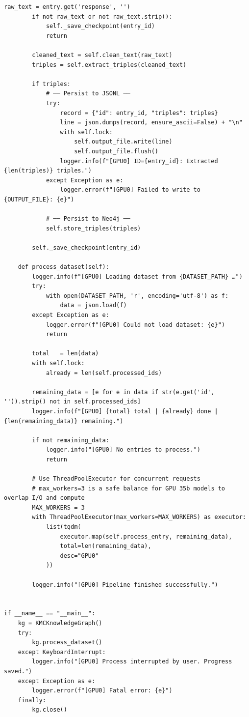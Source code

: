\documentclass[11pt]{article}
\begin{document}
\begin{lstlisting}[style=pythoncode, caption={kg\_generator\_gpu\_0.py}]
        raw_text = entry.get('response', '')
        if not raw_text or not raw_text.strip():
            self._save_checkpoint(entry_id)
            return

        cleaned_text = self.clean_text(raw_text)
        triples = self.extract_triples(cleaned_text)

        if triples:
            # ── Persist to JSONL ──
            try:
                record = {"id": entry_id, "triples": triples}
                line = json.dumps(record, ensure_ascii=False) + "\n"
                with self.lock:
                    self.output_file.write(line)
                    self.output_file.flush()
                logger.info(f"[GPU0] ID={entry_id}: Extracted {len(triples)} triples.")
            except Exception as e:
                logger.error(f"[GPU0] Failed to write to {OUTPUT_FILE}: {e}")

            # ── Persist to Neo4j ──
            self.store_triples(triples)

        self._save_checkpoint(entry_id)

    def process_dataset(self):
        logger.info(f"[GPU0] Loading dataset from {DATASET_PATH} …")
        try:
            with open(DATASET_PATH, 'r', encoding='utf-8') as f:
                data = json.load(f)
        except Exception as e:
            logger.error(f"[GPU0] Could not load dataset: {e}")
            return

        total   = len(data)
        with self.lock:
            already = len(self.processed_ids)
        
        remaining_data = [e for e in data if str(e.get('id', '')).strip() not in self.processed_ids]
        logger.info(f"[GPU0] {total} total | {already} done | {len(remaining_data)} remaining.")

        if not remaining_data:
            logger.info("[GPU0] No entries to process.")
            return

        # Use ThreadPoolExecutor for concurrent requests
        # max_workers=3 is a safe balance for GPU 35b models to overlap I/O and compute
        MAX_WORKERS = 3
        with ThreadPoolExecutor(max_workers=MAX_WORKERS) as executor:
            list(tqdm(
                executor.map(self.process_entry, remaining_data), 
                total=len(remaining_data), 
                desc="GPU0"
            ))

        logger.info("[GPU0] Pipeline finished successfully.")


if __name__ == "__main__":
    kg = KMCKnowledgeGraph()
    try:
        kg.process_dataset()
    except KeyboardInterrupt:
        logger.info("[GPU0] Process interrupted by user. Progress saved.")
    except Exception as e:
        logger.error(f"[GPU0] Fatal error: {e}")
    finally:
        kg.close()
\end{lstlisting}
\end{document}
